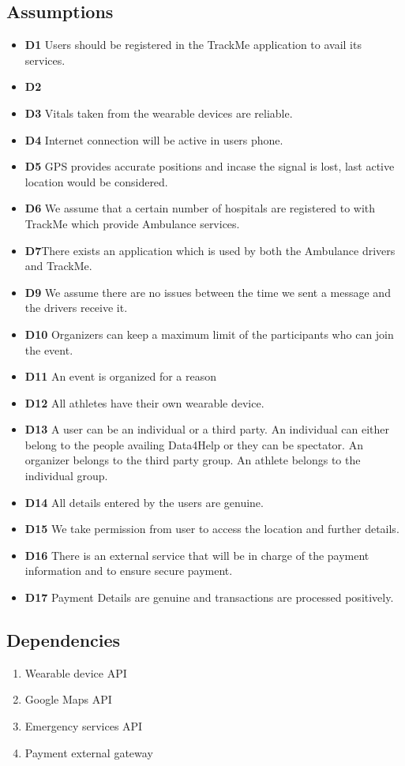 \subsection{Assumptions}
\begin{itemize}
\item \textbf{D1} Users should be registered in the TrackMe application to avail its services.
\item \textbf{D2}  
\item \textbf{D3} Vitals taken from the wearable devices are reliable. 
\item \textbf{D4} Internet connection will be active in users phone. 
\item \textbf{D5} GPS provides accurate positions and incase the signal is lost, last active location would be considered.
\item \textbf{D6} We assume that a certain number of hospitals are registered to with TrackMe which provide Ambulance services.
\item \textbf{D7}There exists an application which is used by both the Ambulance drivers and TrackMe.
\item \textbf{D9} We assume there are no issues between the time we sent a message and the drivers receive it.
\item \textbf{D10} Organizers can keep a maximum limit of the participants who can join the event.
\item \textbf{D11} An event is organized for a reason
\item \textbf{D12} All athletes have their own wearable device.
\item \textbf{D13} A user can be an individual or a third party. An individual can either belong to the people availing Data4Help or they can be spectator. An organizer belongs to the third party group. An athlete belongs to the individual group.
\item \textbf{D14} All details entered by the users are genuine.
\item \textbf{D15} We take permission from user to access the location and further details.
\item \textbf{D16} There is an external service that will be in charge of the payment information and to ensure secure payment.
\item \textbf{D17} Payment Details are genuine and transactions are processed positively.
\end{itemize}

\subsection{Dependencies}
\begin{enumerate}
\item Wearable device API
\item Google Maps API
\item Emergency services API
\item Payment external gateway
\end{enumerate}

